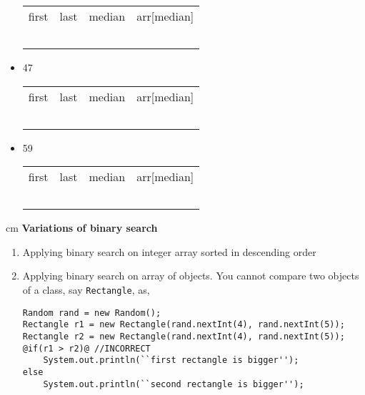 \begin{questions}
\begin{itemize}
\begin{tabular}{c | c | c | c}
\hline
first &	last &	median &	arr[median]\\
& & & \\
& & & \\
& & & \\
& & & \\
& & & \\
\end{tabular}
\vskip 0.5cm

\item 47

\begin{tabular}{c | c | c | c}
\hline
first &	last &	median &	arr[median]\\
& & & \\
& & & \\
& & & \\
& & & \\
& & & \\
\end{tabular}
\vskip 0.5cm

\item 59

\begin{tabular}{c | c | c | c}
\hline
first &	last &	median &	arr[median]\\
& & & \\
& & & \\
& & & \\
& & & \\
& & & \\
\end{tabular}
\end{itemize}

 cm \question \textbf{Variations of binary search} \vskip 0.5cm

\begin{enumerate}
\item Applying binary search on integer array sorted in descending order
\item Applying binary search on array of objects. You cannot compare two objects of a class, say \texttt{Rectangle}, as,

\begin{lstlisting}[style=buggy]
Random rand = new Random();
Rectangle r1 = new Rectangle(rand.nextInt(4), rand.nextInt(5));
Rectangle r2 = new Rectangle(rand.nextInt(4), rand.nextInt(5));
@if(r1 > r2)@ //INCORRECT
	System.out.println(``first rectangle is bigger'');
else
	System.out.println(``second rectangle is bigger'');
\end{lstlisting}


\end{enumerate}
\end{questions}
